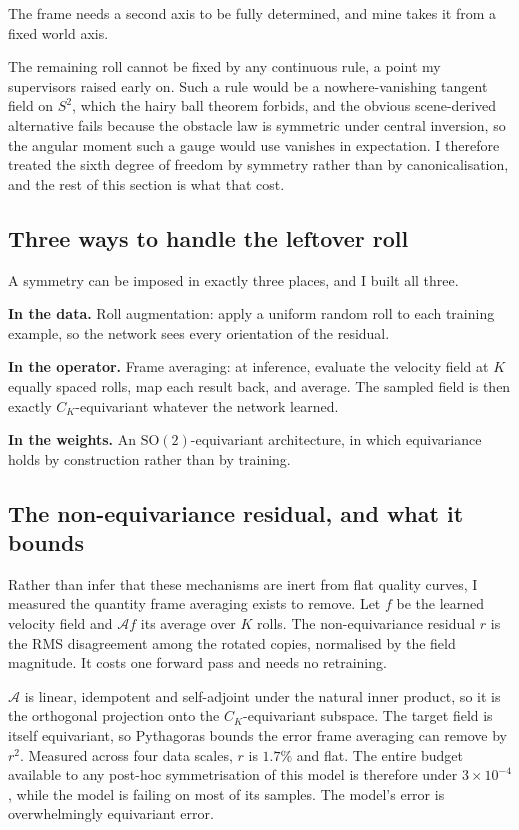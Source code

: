 \documentclass[11pt,a4paper]{article}
\newcommand{\SO}{\mathrm{SO}}
\begin{document}
The frame needs a second axis to be fully determined, and mine takes it from a
fixed world axis.

The remaining roll cannot be fixed by any continuous rule, a point my supervisors
raised early on. Such a rule would be a nowhere-vanishing tangent field on $S^2$,
which the hairy ball theorem forbids, and the obvious scene-derived alternative
fails because the obstacle law is symmetric under central inversion, so the
angular moment such a gauge would use vanishes in expectation. I therefore
treated the sixth degree of freedom by symmetry rather than by canonicalisation,
and the rest of this section is what that cost.

\subsection{Three ways to handle the leftover roll}

A symmetry can be imposed in exactly three places, and I built all three.

\textbf{In the data.} Roll augmentation: apply a uniform random roll to each
training example, so the network sees every orientation of the residual.

\textbf{In the operator.} Frame averaging: at inference, evaluate the velocity
field at $K$ equally spaced rolls, map each result back, and average. The sampled
field is then exactly $C_K$-equivariant whatever the network learned.

\textbf{In the weights.} An $\SO(2)$-equivariant architecture, in which
equivariance holds by construction rather than by training.

\subsection{The non-equivariance residual, and what it bounds}

Rather than infer that these mechanisms are inert from flat quality curves, I
measured the quantity frame averaging exists to remove. Let $f$ be the learned
velocity field and $\mathcal{A}f$ its average over $K$ rolls. The
non-equivariance residual $r$ is the RMS disagreement among the rotated copies,
normalised by the field magnitude. It costs one forward pass and needs no
retraining.

$\mathcal{A}$ is linear, idempotent and self-adjoint under the natural inner
product, so it is the orthogonal projection onto the $C_K$-equivariant subspace.
The target field is itself equivariant, so Pythagoras bounds the error frame
averaging can remove by $r^2$. Measured across four data scales, $r$ is $1.7\%$
and flat. The entire budget available to any post-hoc symmetrisation of this
model is therefore under $3 \times 10^{-4}$, while the model is failing on most
of its samples. The model's error is overwhelmingly equivariant error.
\end{document}
